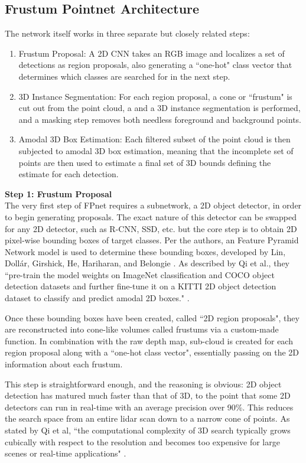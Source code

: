\subsection{Frustum Pointnet Architecture}
The network itself works in three separate but closely related steps: 
\begin{enumerate}
    \item Frustum Proposal: A 2D CNN takes an RGB image and localizes a set of detections as region proposals, also generating a ``one-hot" class vector that determines which classes are searched for in the next step.
    \item 3D Instance Segmentation: For each region proposal, a cone or ``frustum" is cut out from the point cloud, a and a 3D instance segmentation is performed, and a masking step removes both needless foreground and background points.
    \item Amodal 3D Box Estimation: Each filtered subset of the point cloud is then subjected to amodal 3D box estimation, meaning that the incomplete set of points are then used to estimate a final set of 3D bounds defining the estimate for each detection.
\end{enumerate}

\textbf{{\large Step 1: Frustum Proposal}} \\
The very first step of FPnet requires a subnetwork, a 2D object detector, in order to begin generating proposals. The exact nature of this detector can be swapped for any 2D detector, such as R-CNN, SSD, etc. but the core step is to obtain 2D pixel-wise bounding boxes of target classes. Per the authors, an Feature Pyramid Network model is used to determine these bounding boxes, developed by Lin, Dollár, Girshick, He, Hariharan, and Belongie \cite{lin_feature_2017}. As described by Qi et al., they ``pre-train the model weights on ImageNet classification and COCO object detection datasets and further fine-tune it on a KITTI 2D object detection dataset to classify and predict amodal 2D boxes." \cite{qi_frustum_2017}.

Once these bounding boxes have been created, called ``2D region proposals", they are reconstructed into cone-like volumes called frustums via a custom-made function. In combination with the raw depth map, sub-cloud is created for each region proposal along with a ``one-hot class vector", essentially passing on the 2D information about each frustum. 

This step is straightforward enough, and the reasoning is obvious: 2D object detection has matured much faster than that of 3D, to the point that some 2D detectors can run in real-time with an average precision over 90\%. This reduces the search space from an entire lidar scan down to a narrow cone of points. As stated by Qi et al, ``the computational complexity of 3D search typically grows cubically with respect to the resolution and becomes too expensive for large scenes or real-time applications" \cite{qi_frustum_2017}.


